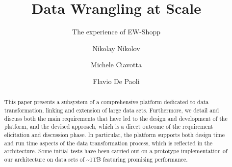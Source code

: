\documentclass[sigconf, final]{acmart}
\begin{document}
\title{Data Wrangling at Scale}
\subtitle{The experience of EW-Shopp}


\author{Nikolay Nikolov}

\author{Michele Ciavotta}

\author{Flavio De Paoli}



\renewcommand{\shortauthors}{N. Nikolov et al.}


\begin{abstract}
This paper presents a subsystem of a comprehensive platform dedicated to data transformation, linking and extension of large data sets. Furthermore, we detail and discuss both the main requirements that have led to the design and development of the platform, and the devised approach, which is a direct outcome of the requirement elicitation and discussion phase. In particular, the platform supports both design time and run time aspects of the data transformation process, which is reflected in the architecture. 
Some initial tests have been carried out on a prototype implementation of our architecture on data sets of \textasciitilde 1TB featuring promising performance. 
\end{abstract}
\end{document}
